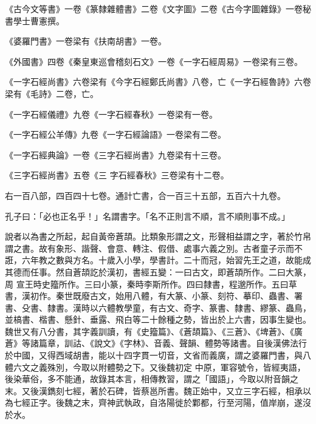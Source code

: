 \begin{pinyinscope}
 《古今文等書》一卷《篆隸雜體書》二卷《文字圖》二卷《古今字圖雜錄》一卷秘書學士曹憲撰。



 《婆羅門書》一卷梁有《扶南胡書》一卷。



 《外國書》四卷《秦皇東巡會稽刻石文》一卷《一字石經周易》一卷梁有三卷。



 《一字石經尚書》六卷梁有《今字石經鄭氏尚書》八卷，亡《一字石經魯詩》六卷梁有《毛詩》二卷，亡。



 《一字石經儀禮》九卷《一字石經春秋》一卷梁有一卷。



 《一字石經公羊傳》九卷《一字石經論語》一卷梁有二卷。



 《一字石經典論》一卷《三字石經尚書》九卷梁有十三卷。



 《三字石經尚書》五卷《三
 字石經春秋》三卷梁有十二卷。



 右一百八部，四百四十七卷。通計亡書，合一百三十五部，五百六十九卷。



 孔子曰：「必也正名乎！」名謂書字。「名不正則言不順，言不順則事不成。」



 說者以為書之所起，起自黃帝蒼頡。比類象形謂之文，形聲相益謂之字，著於竹帛謂之書。故有象形、諧聲、會意、轉注、假借、處事六義之別。古者童子示而不誑，六年教之數與方名。十歲入小學，學書計。二十而冠，始習先王之道，故能成其德而任事。然自蒼頡訖於漢初，書經五變：一曰古文，即蒼頡所作。二曰大篆，周
 宣王時史籀所作。三曰小篆，秦時李斯所作。四曰隸書，程邈所作。五曰草書，漢初作。秦世既廢古文，始用八體，有大篆、小篆、刻符、摹印、蟲書、署書、殳書、隸書。漢時以六體教學童，有古文、奇字、篆書、隸書、繆篆、蟲鳥，並槁書、楷書、懸針、垂露、飛白等二十餘種之勢，皆出於上六書，因事生變也。魏世又有八分書，其字義訓讀，有《史籀篇》、《蒼頡篇》、《三蒼》、《埤蒼》、《廣蒼》等諸篇章，訓詁、《說文》《字林》、音義、聲韻、體勢等諸書。自後漢佛法行於中國，又得西域胡書，能以十四字貫一切音，文省而義廣，謂之婆羅門書，與八體六文之義殊別，今取以附體勢之下。又後魏初定
 中原，軍容號令，皆經夷語，後染華俗，多不能通，故錄其本言，相傳教習，謂之「國語」，今取以附音韻之末。又後漢鐫刻七經，著於石碑，皆蔡邕所書。魏正始中，又立三字石經，相承以為七經正字。後魏之末，齊神武執政，自洛陽徙於鄴都，行至河陽，值岸崩，遂沒於水。




\end{pinyinscope}
